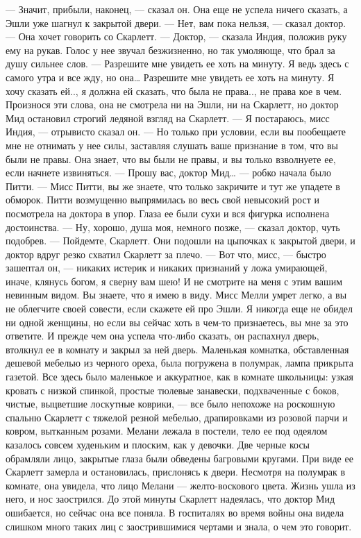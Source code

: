 — Значит, прибыли, наконец, — сказал он. Она еще не успела ничего сказать, а Эшли уже шагнул к закрытой двери.
— Нет, вам пока нельзя, — сказал доктор. — Она хочет говорить со Скарлетт.
— Доктор, — сказала Индия, положив руку ему на рукав. Голос у нее звучал безжизненно, но так умоляюще, что брал за душу сильнее слов. — Разрешите мне увидеть ее хоть на минуту. Я ведь здесь с самого утра и все жду, но она… Разрешите мне увидеть ее хоть на минуту. Я хочу сказать ей.., я должна ей сказать, что была не права.., не права кое в чем.
Произнося эти слова, она не смотрела ни на Эшли, ни на Скарлетт, но доктор Мид остановил строгий ледяной взгляд на Скарлетт.
— Я постараюсь, мисс Индия, — отрывисто сказал он. — Но только при условии, если вы пообещаете мне не отнимать у нее силы, заставляя слушать ваше признание в том, что вы были не правы. Она знает, что вы были не правы, и вы только взволнуете ее, если начнете извиняться.
— Прошу вас, доктор Мид… — робко начала было Питти.
— Мисс Питти, вы же знаете, что только закричите и тут же упадете в обморок.
Питти возмущенно выпрямилась во весь свой невысокий рост и посмотрела на доктора в упор. Глаза ее были сухи и вся фигурка исполнена достоинства.
— Ну, хорошо, душа моя, немного позже, — сказал доктор, чуть подобрев. — Пойдемте, Скарлетт.
Они подошли на цыпочках к закрытой двери, и доктор вдруг резко схватил Скарлетт за плечо.
— Вот что, мисс, — быстро зашептал он, — никаких истерик и никаких признаний у ложа умирающей, иначе, клянусь богом, я сверну вам шею! И не смотрите на меня с этим вашим невинным видом. Вы знаете, что я имею в виду. Мисс Мелли умрет легко, а вы не облегчите своей совести, если скажете ей про Эшли. Я никогда еще не обидел ни одной женщины, но если вы сейчас хоть в чем-то признаетесь, вы мне за это ответите.
И прежде чем она успела что-либо сказать, он распахнул дверь, втолкнул ее в комнату и закрыл за ней дверь. Маленькая комнатка, обставленная дешевой мебелью из черного ореха, была погружена в полумрак, лампа прикрыта газетой. Все здесь было маленькое и аккуратное, как в комнате школьницы: узкая кровать с низкой спинкой, простые тюлевые занавески, подхваченные с боков, чистые, выцветшие лоскутные коврики, — все было непохоже на роскошную спальню Скарлетт с тяжелой резной мебелью, драпировками из розовой парчи и ковром, вытканным розами.
Мелани лежала в постели, тело ее под одеялом казалось совсем худеньким и плоским, как у девочки. Две черные косы обрамляли лицо, закрытые глаза были обведены багровыми кругами. При виде ее Скарлетт замерла и остановилась, прислонясь к двери. Несмотря на полумрак в комнате, она увидела, что лицо Мелани — желто-воскового цвета. Жизнь ушла из него, и нос заострился. До этой минуты Скарлетт надеялась, что доктор Мид ошибается, но сейчас она все поняла. В госпиталях во время войны она видела слишком много таких лиц с заострившимися чертами и знала, о чем это говорит.
